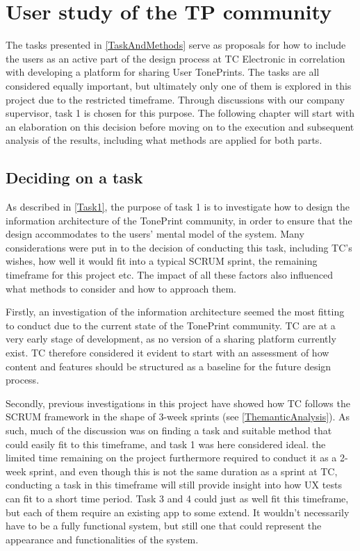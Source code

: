 \chapter{User study of the TP community}
\label{ChapterWorkshop}
The tasks presented in \autoref{TaskAndMethods} serve as proposals for how to include the users as an active part of the design process at TC Electronic in correlation with developing a platform for sharing User TonePrints. The tasks are all considered equally important, but ultimately only one of them is explored in this project due to the restricted timeframe. Through discussions with our company supervisor, task 1 is chosen for this purpose. The following chapter will start with an elaboration on this decision before moving on to the execution and subsequent analysis of the results, including what methods are applied for both parts.

\section{Deciding on a task}
\label{TaskDecision}
As described in \autoref{Task1}, the purpose of task 1 is to investigate how to design the information architecture of the TonePrint community, in order to ensure that the design accommodates to the users' mental model of the system. Many considerations were put in to the decision of conducting this task, including TC's wishes, how well it would fit into a typical SCRUM sprint, the remaining timeframe for this project etc. The impact of all these factors also influenced what methods to consider and how to approach them.

Firstly, an investigation of the information architecture seemed the most fitting to conduct due to the current state of the TonePrint community. TC are at a very early stage of development, as no version of a sharing platform currently exist. TC therefore considered it evident to start with an assessment of how content and features should be structured as a baseline for the future design process.

Secondly, previous investigations in this project have showed how TC follows the SCRUM framework in the shape of 3-week sprints (see \autoref{ThemanticAnalysis}). As such, much of the discussion was on finding a task and suitable method that could easily fit to this timeframe, and task 1 was here considered ideal. the limited time remaining on the project furthermore required to conduct it as a 2-week sprint, and even though this is not the same duration as a sprint at TC, conducting a task in this timeframe will still provide insight into how UX tests can fit to a short time period. Task 3 and 4 could just as well fit this timeframe, but each of them require an existing app to some extend. It wouldn't necessarily have to be a fully functional system, but still one that could represent the appearance and functionalities of the system.

